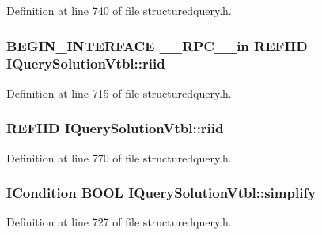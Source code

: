 Definition at line 740 of file structuredquery.\+h.

\subsubsection[{\texorpdfstring{riid}{riid}}]{\setlength{\rightskip}{0pt plus 5cm}B\+E\+G\+I\+N\+\_\+\+I\+N\+T\+E\+R\+F\+A\+CE {\bf \+\_\+\+\_\+\+R\+P\+C\+\_\+\+\_\+in} {\bf R\+E\+F\+I\+ID} I\+Query\+Solution\+Vtbl\+::riid}\hypertarget{struct_i_query_solution_vtbl_a7ed76986d2af923fb7c3383c34a44204}{}\label{struct_i_query_solution_vtbl_a7ed76986d2af923fb7c3383c34a44204}


Definition at line 715 of file structuredquery.\+h.

\subsubsection[{\texorpdfstring{riid}{riid}}]{ {\bf R\+E\+F\+I\+ID} I\+Query\+Solution\+Vtbl\+::riid}\hypertarget{struct_i_query_solution_vtbl_a210ec92bda9119ca8bd53038933009f2}{}\label{struct_i_query_solution_vtbl_a210ec92bda9119ca8bd53038933009f2}


Definition at line 770 of file structuredquery.\+h.

\subsubsection[{\texorpdfstring{simplify}{simplify}}]{ {\bf I\+Condition} {\bf B\+O\+OL} I\+Query\+Solution\+Vtbl\+::simplify}\hypertarget{struct_i_query_solution_vtbl_aece12987e254b027c2aca1de396b77b7}{}\label{struct_i_query_solution_vtbl_aece12987e254b027c2aca1de396b77b7}


Definition at line 727 of file structuredquery.\+h.


